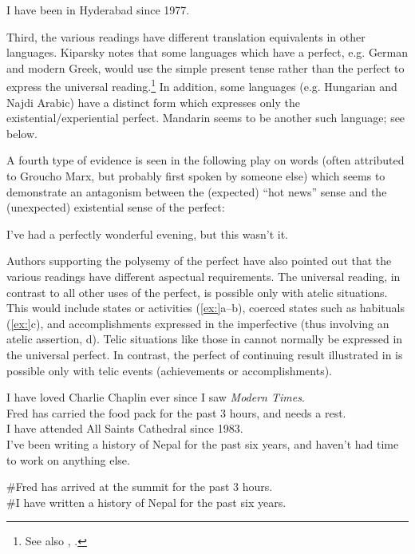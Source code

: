 \ea
I have been in Hyderabad since 1977.
\z


Third, the various readings have different translation equivalents in other languages. Kiparsky notes that some languages which have a perfect, e.g. German and modern Greek, would use the simple present tense rather than the perfect to express the universal reading.\footnote{See also \citet{Comrie1976}, \citet{Klein2009}.} In addition, some languages (e.g. Hungarian and Najdi Arabic) have a distinct form which expresses only the existential/experiential perfect. Mandarin seems to be another such language; see  below.



A fourth type of evidence is seen in the following play on words (often attributed to Groucho Marx, but probably first spoken by someone else) which seems to demonstrate an antagonism between the (expected) “hot news” sense and the (unexpected) existential sense of the perfect:


\ea
I’ve had a perfectly wonderful evening, but this wasn’t it.
\z


Authors supporting the polysemy of the perfect have also pointed out that the various readings have different aspectual requirements. The universal reading, in contrast to all other uses of the perfect, is possible only with atelic situations. This would include states or activities (\ref{ex:}a--b), coerced states such as habituals (\ref{ex:}c), and accomplishments expressed in the imperfective (thus involving an atelic assertion, d). Telic situations like those in  cannot normally be expressed in the universal perfect. In contrast, the perfect of continuing result illustrated in  is possible only with telic events (achievements or accomplishments).


\ea
\ea I have loved Charlie Chaplin ever since I saw \textit{Modern Times}.\\
\ex Fred has carried the food pack for the past 3 hours, and needs a rest.\\
\ex I have attended All Saints Cathedral since 1983.\\
\ex I’ve been writing a history of Nepal for the past six years, and haven’t had time\\
  to work on anything else.
                       \z
\z

\ea
\ea \#Fred has arrived at the summit for the past 3 hours.\\
\ex \#I have written a history of Nepal for the past six years.
                       \z
\z


